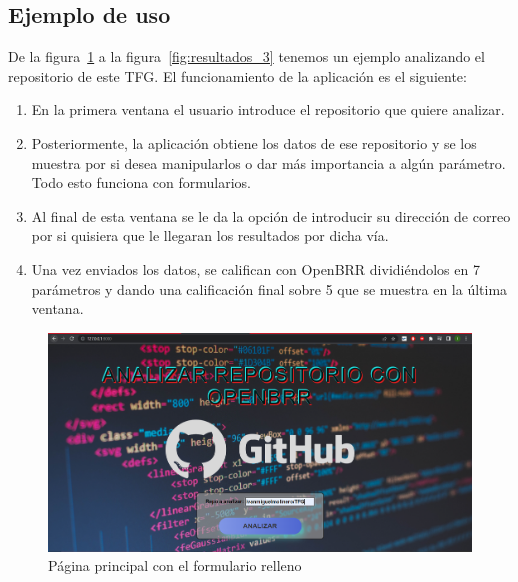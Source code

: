 \documentclass[a4paper, 12pt]{book}
\begin{document}
\subsection{Ejemplo de uso}
De la figura~\ref{fig:ivanmiguelmolinero/TFG_2} a la figura~\ref{fig:resultados_3} tenemos un ejemplo analizando el repositorio de este TFG. El funcionamiento de la aplicación es el siguiente:

\begin{enumerate}
	\item En la primera ventana el usuario introduce el repositorio que quiere analizar.
	\item Posteriormente, la aplicación obtiene los datos de ese repositorio y se los muestra por si desea manipularlos o dar más importancia a algún parámetro. Todo esto funciona con formularios.
	\item Al final de esta ventana se le da la opción de introducir su dirección de correo por si quisiera que le llegaran los resultados por dicha vía.
	\item Una vez enviados los datos, se califican con OpenBRR dividiéndolos en 7 parámetros y dando una calificación final sobre 5 que se muestra en la última ventana.
\end{enumerate}

\begin{figure}
    
    \includegraphics[bb=0 0 800 600, width=12cm, keepaspectratio]{img/maintfg.png}
    \caption{Página principal con el formulario relleno}\label{fig:ivanmiguelmolinero/TFG_2}
\end{figure}
\end{document}
